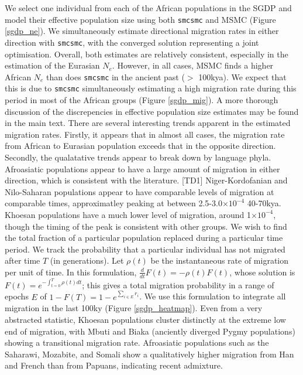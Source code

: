 \documentclass{article}
\begin{document}
We select one individual from each of the African populations in the SGDP and model their effective population size using both {\tt smcsmc} and MSMC (Figure \ref{sgdp_ne}). We simultaneously estimate directional migration rates in either direction with {\tt smcsmc}, with the converged solution representing a joint optimisation. Overall, both estimates are relatively consistent, especially in the estimation of the Eurasian $N_e$. However, in all cases, MSMC finds a higher African $N_e$ than does {\tt smcsmc} in the ancient past ($>$ 100kya). We expect that this is due to {\tt smcsmc} simultaneously estimating a high migration rate during this period in most of the African groups (Figure \ref{sgdp_mig}). A more thorough discussion of the discrepencies in effective population size estimates may be found in the main text. There are several interesting trends apparent in the estimated migration rates. Firstly, it appears that in almost all cases, the migration rate from African to Eurasian population exceeds that in the opposite direction. Secondly, the qualatative trends appear to break down by language phyla. Afroasiatic populations appear to have a large amount of migration in either direction, which is consistent with the literature. [TD1] Niger-Kordofanian and Nilo-Saharan populations appear to have comparable levels of migration at comparable times, approximatley peaking at between 2.5-3.0$\times 10^{-4}$ 40-70kya. Khoesan populations have a much lower level of migration, around 1$\times 10^{-4}$, though the timing of the peak is consistent with other groups. We wish to find the total fraction of a particular population replaced during a particular time period. We track the probability that a particular individual has not migrated after time $T$ (in generations). Let $\rho(t)$ be the instantaneous rate of migration per unit of time. In this formulation, $\frac{d}{dt} F(t) = - \rho(t) F(t)$, whose solution is $F(t) = e^{- \int_{t=0}^T \rho(t) dt}$; this gives a total migration probability in a range of epochs $E$ of  $1-F(T) = 1 - e^{\sum_{i \in E} r_i}$. We use this formulation to integrate all migration in the last 100ky (Figure \ref{sgdp_heatmap}). Even from a very abstracted statistic, Khoesan populations cluster distinctly at the extreme low end of migration, with Mbuti and Biaka (anciently diverged Pygmy populations) showing a transitional migration rate. Afroasiatic populations such as the Saharawi, Mozabite, and Somali show a qualitatively higher migration from Han and French than from Papuans, indicating recent admixture. 
\end{document}
